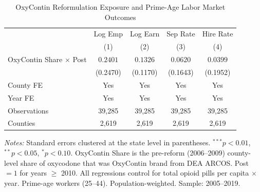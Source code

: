\begin{table}[t]
\centering
\caption{OxyContin Reformulation Exposure and Prime-Age Labor Market Outcomes}
\label{tab:main}
\begin{threeparttable}
\begin{tabular}{lcccc}
\toprule
 & Log Emp & Log Earn & Sep Rate & Hire Rate \\
 & (1) & (2) & (3) & (4) \\
\midrule
OxyContin Share $\times$ Post & $0.2401$ & $0.1326$ & $0.0620$ & $0.0399$ \\
 & (0.2470) & (0.1170) & (0.1643) & (0.1952) \\
\midrule
County FE & Yes & Yes & Yes & Yes \\
Year FE & Yes & Yes & Yes & Yes \\
Observations & 39,285 & 39,285 & 39,285 & 39,285 \\
Counties & 2,619 & 2,619 & 2,619 & 2,619 \\
\bottomrule
\end{tabular}
\begin{tablenotes}[flushleft]
\footnotesize
\item \textit{Notes:} Standard errors clustered at the state level in parentheses. $^{***}p<0.01$, $^{**}p<0.05$, $^{*}p<0.10$. OxyContin Share is the pre-reform (2006--2009) county-level share of oxycodone that was OxyContin brand from DEA ARCOS. Post $= 1$ for years $\geq$ 2010. All regressions control for total opioid pills per capita $\times$ year. Prime-age workers (25--44). Population-weighted. Sample: 2005--2019.
\end{tablenotes}
\end{threeparttable}
\end{table}

